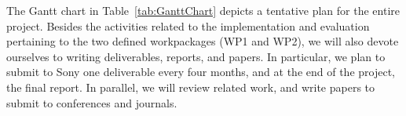 The Gantt chart in Table~\ref{tab:GanttChart} depicts a tentative plan for the entire project. %
Besides the activities related to the implementation and evaluation pertaining to the two defined workpackages (WP1 and WP2), %
we will also devote ourselves to writing deliverables, reports, and %
papers. In particular, we plan to submit to Sony one deliverable every four months, and at the end of the project, %
the final report. In parallel, we will review related work, and write papers to submit to conferences and journals.







